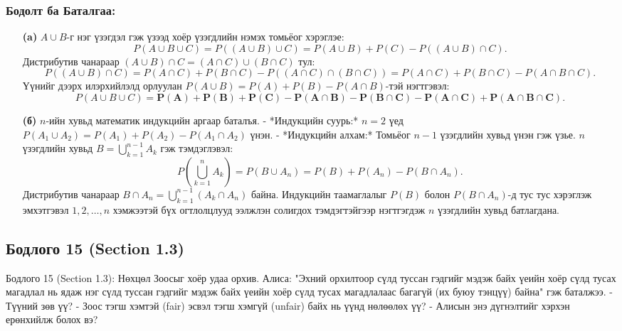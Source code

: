 \documentclass[11pt,a4paper]{article}
\begin{document}
\subsubsection*{Бодолт ба Баталгаа:}

\begin{itemize}[leftmargin=1.4em, itemsep=3pt]
  \item[\textbf{(a)}] $A \cup B$-г нэг үзэгдэл гэж үзээд хоёр үзэгдлийн нэмэх томьёог хэрэглэе:
  \[
    P(A \cup B \cup C) = P((A \cup B) \cup C) = P(A \cup B) + P(C) - P((A \cup B) \cap C).
  \]
  Дистрибутив чанараар $(A \cup B) \cap C = (A \cap C) \cup (B \cap C)$ тул:
  \[
    P((A \cup B) \cap C) = P(A \cap C) + P(B \cap C) - P((A \cap C) \cap (B \cap C)) = P(A \cap C) + P(B \cap C) - P(A \cap B \cap C).
  \]
  Үүнийг дээрх илэрхийлэлд орлуулан $P(A \cup B) = P(A) + P(B) - P(A \cap B)$-тэй нэгтгэвэл:
  \[
    P(A \cup B \cup C) = \mathbf{P(A) + P(B) + P(C) - P(A \cap B) - P(B \cap C) - P(A \cap C) + P(A \cap B \cap C)}.
  \]

  \item[\textbf{(б)}] $n$-ийн хувьд математик индукцийн аргаар баталъя.
  - *Индукцийн суурь:* $n=2$ үед $P(A_1 \cup A_2) = P(A_1) + P(A_2) - P(A_1 \cap A_2)$ үнэн.
  - *Индукцийн алхам:* Томьёог $n-1$ үзэгдлийн хувьд үнэн гэж үзье. $n$ үзэгдлийн хувьд $B = \bigcup_{k=1}^{n-1} A_k$ гэж тэмдэглэвэл:
    \[
      P\left(\bigcup_{k=1}^n A_k\right) = P(B \cup A_n) = P(B) + P(A_n) - P(B \cap A_n).
    \]
    Дистрибутив чанараар $B \cap A_n = \bigcup_{k=1}^{n-1} (A_k \cap A_n)$ байна. Индукцийн таамаглалыг $P(B)$ болон $P(B \cap A_n)$-д тус тус хэрэглэж эмхэтгэвэл $1, 2, \dots, n$ хэмжээтэй бүх огтлолцлууд ээлжлэн солигдох тэмдэгтэйгээр нэгтгэгдэж $n$ үзэгдлийн хувьд батлагдана.
\end{itemize}

\vspace{0.8em}

\subsection*{Бодлого 15 (Section 1.3)}

\begin{problembox}{Бодлого 15 (Section 1.3): Нөхцөл}
Зоосыг хоёр удаа орхив. Алиса: "Эхний орхилтоор сүлд туссан гэдгийг мэдэж байх үеийн хоёр сүлд тусах магадлал нь ядаж нэг сүлд туссан гэдгийг мэдэж байх үеийн хоёр сүлд тусах магадлалаас багагүй (их буюу тэнцүү) байна" гэж баталжээ.
- Түүний зөв үү?
- Зоос тэгш хэмтэй (fair) эсвэл тэгш хэмгүй (unfair) байх нь үүнд нөлөөлөх үү?
- Алисын энэ дүгнэлтийг хэрхэн ерөнхийлж болох вэ?
\end{problembox}
\end{document}
